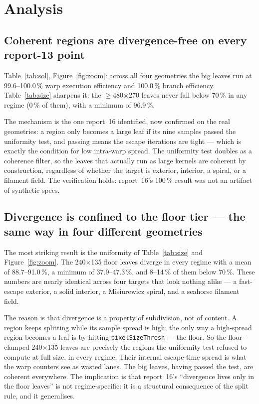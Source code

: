 \documentclass[
	english,
	letterpaper, oneside
]{article}
\begin{document}
\section{Analysis}

\subsection{Coherent regions are divergence-free on every report-13 point}

Table~\ref{tab:sol}, Figure~\ref{fig:zoom}: across all four geometries the big
leaves run at 99.6--100.0\,\% warp execution efficiency and 100.0\,\%
branch efficiency. Table~\ref{tab:size} sharpens it: the $\ge$480$\times$270
leaves never fall below 70\,\% in any regime (0\,\% of them), with a minimum of
96.9\,\%.

The mechanism is the one report~16 identified, now confirmed on the real
geometries: a region only becomes a large leaf if its nine samples passed the
uniformity test, and passing means the escape iterations are tight --- which is
exactly the condition for low intra-warp spread. The uniformity test doubles as a
coherence filter, so the leaves that actually run as large kernels are coherent by
construction, regardless of whether the target is exterior, interior, a spiral, or
a filament field. The verification holds: report~16's 100\,\% result was not an
artifact of synthetic specs.

\subsection{Divergence is confined to the floor tier --- the same way in four
different geometries}

The most striking result is the uniformity of Table~\ref{tab:size} and
Figure~\ref{fig:zoom}. The 240$\times$135 floor leaves diverge in every regime
with a mean of 88.7--91.0\,\%, a minimum of 37.9--47.3\,\%, and 8--14\,\% of them
below 70\,\%. These numbers are nearly identical across four targets that look
nothing alike --- a fast-escape exterior, a solid interior, a Misiurewicz spiral,
and a seahorse filament field.

The reason is that divergence is a property of subdivision, not of content.
A region keeps splitting while its sample spread is high; the only way a
high-spread region becomes a leaf is by hitting \texttt{pixelSizeThresh} --- the
floor. So the floor-clamped 240$\times$135 leaves are precisely the regions the
uniformity test refused to compute at full size, in every regime. Their
internal escape-time spread is what the warp counters see as wasted lanes. The big
leaves, having passed the test, are coherent everywhere. The implication is that
report~16's ``divergence lives only in the floor leaves'' is not regime-specific:
it is a structural consequence of the split rule, and it generalises.
\end{document}

